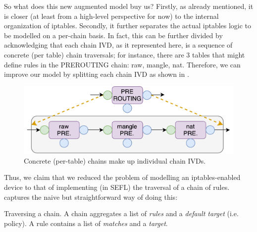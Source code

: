 So what does this new augmented model buy us?  Firstly, as already mentioned,
it is closer (at least from a high-level perspective for now) to the internal
organization of iptables.  Secondly, it further separates the actual iptables
logic to be modelled on a per-chain basis.  In fact, this can be further
divided by acknowledging that each chain IVD, as it represented here, is a
sequence of concrete (per table) chain traversals; for instance, there are 3
tables that might define rules in the PREROUTING chain: raw, mangle, nat.
Therefore, we can improve our model by splitting each chain IVD as shown in
.

\begin{figure}[h]
  \centering
  \captionsetup{justification=centering}
  \includegraphics[scale=0.5]{src/img/iptables-2-composition}
  \caption[Concrete (per-table) chains make up individual chain IVDs.]{Concrete
  (per-table) chains make up individual chain IVDs.}
  \label{fig:iptables-2-composition}
\end{figure}

Thus, we claim that we reduced the problem of modelling an iptables-enabled
device to that of implementing (in SEFL) the traversal of a chain of rules.
 captures the naive but
straightforward way of doing this:

\begin{algorithm}[H]

  \caption[Traversing a chain.]{Traversing a chain. A chain aggregates a list
  of \emph{rules} and a \emph{default target} (i.e. policy). A rule contains a
  list of \emph{matches} and a \emph{target}.}
  \label{algo:chain-traversal}
\end{algorithm}

